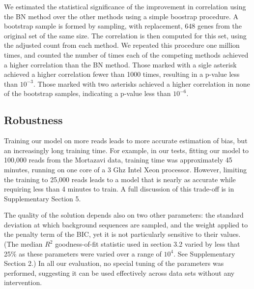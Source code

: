 \documentclass{bioinfo}
\begin{document}
\begin{table}
{
We estimated the statistical significance of the improvement in correlation
using the BN method over the other methods using a simple boostrap procedure. A
bootstrap sample is formed by sampling, with replacement, 648 genes from the
original set of the same size. The correlation is then computed for this set,
using the adjusted count from each method. We repeated this procedure one
million times, and counted the number of times each of the competing methods
achieved a higher correlation than the BN method.  Those marked with a sigle
asterisk achieved a higher correlation fewer than 1000 times, resulting in a
p-value less than $10^{-3}$.  Those marked with two asterisks achieved a higher
correlation in none of the bootstrap samples, indicating a p-value less than
$10^{-6}$.
}
\end{table}

\subsection{Robustness}

Training our model on more reads leads to more accurate estimation of bias, but
an increasingly long training time. For example, in our tests, fitting our model to
100,000 reads from the Mortazavi data, training time was approximately 45
minutes, running on one core of a 3 Ghz Intel Xeon processor. However, limiting
the training to 25,000 reads leads to a model that is nearly as accurate while
requiring less than 4 minutes to train. A full discussion of this trade-off is in
Supplementary Section 5.

The quality of the solution depends also on two other parameters: the standard
deviation at which background sequences are sampled, and the weight applied to
the penalty term of the BIC, yet it is not particularly sensitive to their
values. (The median $R^2$ goodness-of-fit statistic used in section 3.2 varied
by less that 25\% as these parameters were varied over a range of $10^4$. See
Supplementary Section 2.) In all our evaluation, no special tuning of the
parameters was performed, suggesting it can be used effectively across data sets
without any intervention.
\end{document}
